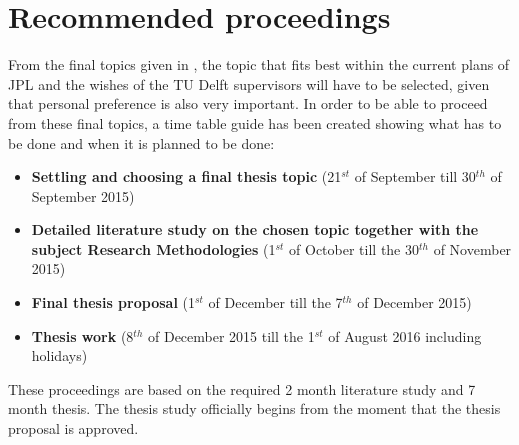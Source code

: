 \chapter{Recommended proceedings}
\label{ch:recproc}
From the final topics given in , the topic that fits best within the current plans of \ac{JPL} and the wishes of the TU Delft supervisors will have to be selected, given that personal preference is also very important. In order to be able to proceed from these final topics, a time table guide has been created showing what has to be done and when it is planned to be done:

\begin{itemize}
\item \textbf{Settling and choosing a final thesis topic} (21$^{st}$ of September till 30$^{th}$ of September 2015)
\item \textbf{Detailed literature study on the chosen topic together with the subject Research Methodologies} (1$^{st}$ of October till the 30$^{th}$ of November 2015)
\item \textbf{Final thesis proposal} (1$^{st}$ of December till the 7$^{th}$ of December 2015)
\item \textbf{Thesis work} (8$^{th}$ of December 2015 till the 1$^{st}$ of August 2016  including holidays)
\end{itemize}

These proceedings are based on the required 2 month literature study and 7 month thesis. The thesis study officially begins from the moment that the thesis proposal is approved. 